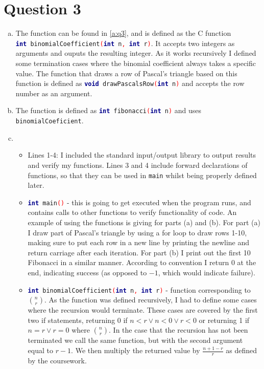 \documentclass[11pt]{article} %
\begin{document}
\section*{Question 3}
\begin{enumerate}[(a)]
	\item The function can be found in \cref{a:q3}, and is defined as the C function \\ \texttt{\footnotesize \textbf{\textcolor{darkBlue}{int}}~binomialCoefficient\textcolor{red}{(}\textbf{\textcolor{darkBlue}{int}}~n\textcolor{red}{,}~\textbf{\textcolor{darkBlue}{int}}~r\textcolor{red}{)}}. It accepts two integers as arguments and ouputs the resulting integer. As it works recursively I defined some termination cases where the binomial coefficient always takes a specific value. The function that draws a row of Pascal's triangle based on this function is defined as \texttt{\footnotesize \textbf{\textcolor{darkBlue}{void}}~drawPascalsRow\textcolor{red}{(}\textbf{\textcolor{darkBlue}{int}}~n\textcolor{red}{)}} and accepts the row number as an argument.
	\item The function is defined as \texttt{\footnotesize \textbf{\textcolor{darkBlue}{int}}~fibonacci\textcolor{red}{(}\textbf{\textcolor{darkBlue}{int}}~n\textcolor{red}{)}} and uses \texttt{\footnotesize binomialCoeficient}.
	\item \begin{itemize}
		\item Lines 1-4: I included the standard input/output library to output results and verify my functions. Lines 3 and 4 include forward declarations of functions, so that they can be used in \texttt{\footnotesize main} whilst being properly defined later.
		\item \texttt{\footnotesize \textbf{\textcolor{darkBlue}{int}}~main\textcolor{red}{(}\textcolor{red}{)}} - this is going to get executed when the program runs, and contains calls to other functions to verify functionality of code. An example of using the functions is giving for parts (a) and (b). For part (a) I draw part of Pascal's triangle by using a for loop to draw rows 1-10, making sure to put each row in a new line by printing the newline and return carriage after each iteration. For part (b) I print out the first 10 Fibonacci in a similar manner. According to convention I return 0 at the end, indicating success (as opposed to $-1$, which would indicate failure).
		\item \texttt{\footnotesize \textbf{\textcolor{darkBlue}{int}}~binomialCoefficient\textcolor{red}{(}\textbf{\textcolor{darkBlue}{int}}~n\textcolor{red}{,}~\textbf{\textcolor{darkBlue}{int}}~r\textcolor{red}{)}} - function corresponding to $n\choose r$. As the function was defined recursively, I had to define some cases where the recursion would terminate. These cases are covered by the first two if statements, returning 0 if $n<r\vee n<0 \vee r<0$ or returning 1 if $n=r \vee r=0$ where ${n \choose r} $. In the case that the recursion has not been terminated we call the same function, but with the second argument equal to $r-1$. We then multiply the returned value by $\frac{n+1-r}{r}$ as defined by the coursework.

\end{itemize}
\end{enumerate}
\end{document}
